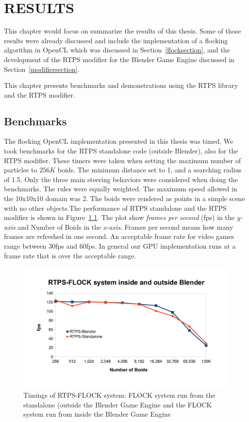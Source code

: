 \chapter{RESULTS}\label{resultsChapter}

This chapter would focus on summarize the results of this thesis. Some of those results were already discussed and include the implementation of a flocking algorithm in OpenCL which was discussed in Section~\ref{flocksection}, and the development of the RTPS modifier for the Blender Game Engine discussed in Section~\ref{modifiersection}. 

This chapter presents benchmarks and demonstrations using the RTPS library and the RTPS modifier.

\section{Benchmarks}

The flocking OpenCL implementation presented in this thesis was timed. We took benchmarks for the RTPS standalone code (outside Blender), also for the RTPS modifier. These timers were taken when setting the maximum number of particles to $256K$ boids. The minimum distance set to 1, and a searching radius of 1.5. Only the three main steering behaviors were considered when doing the benchmarks. The rules were equally weighted. The maximum speed allowed in the 10x10x10 domain was 2. The boids were rendered as points in a simple scene with no other objects.The performance of RTPS standalone and the RTPS modifier is shown in Figure~\ref{RTPSvsRTPS}. The plot show \textit{frames per second} (fps) in the \textit{y-axis} and Number of Boids in the \textit{x-axis}. Frames per second means how many frames are refreshed in one second. An acceptable frame rate for video games range between 30fps and 60fps. In general our GPU implementation runs at a frame rate that is over the acceptable range. 

\begin{figure}[htbp]
\begin{center}
\includegraphics[scale=0.7]{figures/RTPSvsRTPS.pdf}
\caption{Timings of RTPS-FLOCK system: FLOCK system run from the standalone (outside the Blender Game Engine and the FLOCK system run from inside the Blender Game Engine}
\label{RTPSvsRTPS}
\end{center}
\end{figure}

